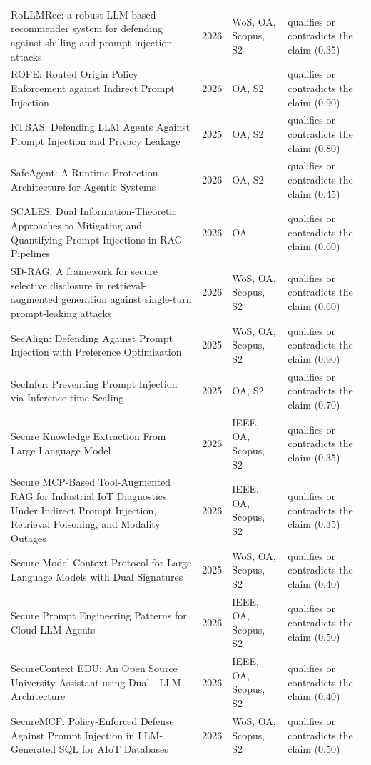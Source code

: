 \begin{longtable}{@{}%
  >{\raggedright\arraybackslash}p{}c%
  >{\raggedright\arraybackslash}p{}%
  >{\raggedright\arraybackslash}p{}@{}}
RoLLMRec: a robust LLM-based recommender system for defending against shilling and prompt injection attacks & 2026 & WoS, OA, Scopus, S2 & qualifies or contradicts the claim (0.35) \\
ROPE: Routed Origin Policy Enforcement against Indirect Prompt Injection & 2026 & OA, S2 & qualifies or contradicts the claim (0.90) \\
RTBAS: Defending LLM Agents Against Prompt Injection and Privacy Leakage & 2025 & OA, S2 & qualifies or contradicts the claim (0.80) \\
SafeAgent: A Runtime Protection Architecture for Agentic Systems & 2026 & OA, S2 & qualifies or contradicts the claim (0.45) \\
SCALES: Dual Information-Theoretic Approaches to Mitigating and Quantifying Prompt Injections in RAG Pipelines & 2026 & OA & qualifies or contradicts the claim (0.60) \\
SD-RAG: A framework for secure selective disclosure in retrieval-augmented generation against single-turn prompt-leaking attacks & 2026 & WoS, OA, Scopus, S2 & qualifies or contradicts the claim (0.60) \\
SecAlign: Defending Against Prompt Injection with Preference Optimization & 2025 & WoS, OA, Scopus, S2 & qualifies or contradicts the claim (0.90) \\
SecInfer: Preventing Prompt Injection via Inference-time Scaling & 2025 & OA, S2 & qualifies or contradicts the claim (0.70) \\
Secure Knowledge Extraction From Large Language Model & 2026 & IEEE, OA, Scopus, S2 & qualifies or contradicts the claim (0.35) \\
Secure MCP-Based Tool-Augmented RAG for Industrial IoT Diagnostics Under Indirect Prompt Injection, Retrieval Poisoning, and Modality Outages & 2026 & IEEE, OA, Scopus, S2 & qualifies or contradicts the claim (0.35) \\
Secure Model Context Protocol for Large Language Models with Dual Signatures & 2025 & WoS, OA, Scopus, S2 & qualifies or contradicts the claim (0.40) \\
Secure Prompt Engineering Patterns for Cloud LLM Agents & 2026 & IEEE, OA, Scopus, S2 & qualifies or contradicts the claim (0.50) \\
SecureContext EDU: An Open Source University Assistant using Dual - LLM Architecture & 2026 & IEEE, OA, Scopus, S2 & qualifies or contradicts the claim (0.40) \\
SecureMCP: Policy-Enforced Defense Against Prompt Injection in LLM-Generated SQL for AIoT Databases & 2026 & WoS, OA, Scopus, S2 & qualifies or contradicts the claim (0.50) \\

\end{longtable}
